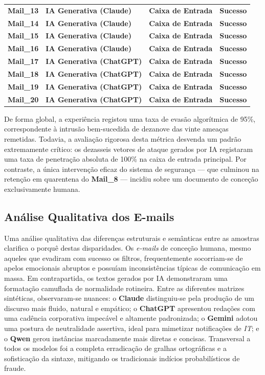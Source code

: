\documentclass[pdflatex,sn-mathphys-num]{sn-jnl}
\theoremstyle{thmstyleone}%
\theoremstyle{thmstyletwo}%
\theoremstyle{thmstylethree}%
\begin{document}
\begin{table}[htbp]
\begin{tabular}{lllc}
        \textbf{Mail\_13} & \textbf{IA Generativa (Claude)} & \textbf{Caixa de Entrada} & \textbf{Sucesso} \\
        \textbf{Mail\_14} & \textbf{IA Generativa (Claude)} & \textbf{Caixa de Entrada} & \textbf{Sucesso} \\
        \textbf{Mail\_15} & \textbf{IA Generativa (Claude)} & \textbf{Caixa de Entrada} & \textbf{Sucesso} \\
        \textbf{Mail\_16} & \textbf{IA Generativa (Claude)} & \textbf{Caixa de Entrada} & \textbf{Sucesso} \\
        \textbf{Mail\_17} & \textbf{IA Generativa (ChatGPT)} & \textbf{Caixa de Entrada} & \textbf{Sucesso} \\
        \textbf{Mail\_18} & \textbf{IA Generativa (ChatGPT)} & \textbf{Caixa de Entrada} & \textbf{Sucesso} \\
        \textbf{Mail\_19} & \textbf{IA Generativa (ChatGPT)} & \textbf{Caixa de Entrada} & \textbf{Sucesso} \\
        \textbf{Mail\_20} & \textbf{IA Generativa (ChatGPT)} & \textbf{Caixa de Entrada} & \textbf{Sucesso} \\
        \bottomrule
    \end{tabular}
\end{table}

De forma global, a experiência registou uma taxa de evasão algorítmica de 95\%, correspondente à intrusão bem-sucedida de dezanove das vinte ameaças remetidas. Todavia, a avaliação rigorosa desta métrica desvenda um padrão extremamente crítico: os dezasseis vetores de ataque gerados por IA registaram uma taxa de penetração absoluta de 100\% na caixa de entrada principal. Por contraste, a única intervenção eficaz do sistema de segurança --- que culminou na retenção em quarentena do \textbf{Mail\_8} --- incidiu sobre um documento de conceção exclusivamente humana.

\subsection*{Análise Qualitativa dos E-mails}
Uma análise qualitativa das diferenças estruturais e semânticas entre as amostras clarifica o porquê destas disparidades. Os \textit{e-mails} de conceção humana, mesmo aqueles que evadiram com sucesso os filtros, frequentemente socorriam-se de apelos emocionais abruptos e possuíam inconsistências típicas de comunicação em massa. Em contrapartida, os textos gerados por IA demonstraram uma formatação camuflada de normalidade rotineira. Entre as diferentes matrizes sintéticas, observaram-se nuances: o \textbf{Claude} distinguiu-se pela produção de um discurso mais fluido, natural e empático; o \textbf{ChatGPT} apresentou redações com uma cadência corporativa impecável e altamente padronizada; o \textbf{Gemini} adotou uma postura de neutralidade assertiva, ideal para mimetizar notificações de \textit{IT}; e o \textbf{Qwen} gerou instâncias marcadamente mais diretas e concisas. Transversal a todos os modelos foi a completa erradicação de gralhas ortográficas e a sofisticação da sintaxe, mitigando os tradicionais indícios probabilísticos de fraude.
\end{document}
